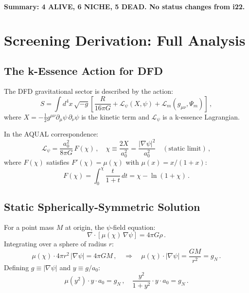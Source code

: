 \documentclass[11pt]{article}
\newcommand{\aM}{a_0}
\begin{document}
\textbf{Summary: 4 ALIVE, 6 NICHE, 5 DEAD.  No status changes from i22.}

\section{Screening Derivation: Full Analysis}
\label{sec:screening}

\subsection{The k-Essence Action for DFD}

The DFD gravitational sector is described by the action:
\begin{equation}
S = \int d^4x\,\sqrt{-g}\left[\frac{R}{16\pi G}
+ \mathcal{L}_\psi(X, \psi) + \mathcal{L}_m(g_{\mu\nu}, \Psi_m)\right]\,,
\end{equation}
where $X = -\frac{1}{2}g^{\mu\nu}\partial_\mu\psi\,\partial_\nu\psi$
is the kinetic term and $\mathcal{L}_\psi$ is a k-essence Lagrangian.

In the AQUAL correspondence:
\begin{equation}
\mathcal{L}_\psi = \frac{\aM^2}{8\pi G}\,F(\chi)\,,
\quad
\chi \equiv \frac{2X}{\aM^2} = \frac{|\nabla\psi|^2}{\aM^2}
\quad (\text{static limit})\,,
\end{equation}
where $F(\chi)$ satisfies $F'(\chi) = \mu(\chi)$ with
$\mu(x) = x/(1+x)$:
\begin{equation}
F(\chi) = \int_0^\chi \frac{t}{1+t}\,dt = \chi - \ln(1+\chi)\,.
\end{equation}

\subsection{Static Spherically-Symmetric Solution}

For a point mass $M$ at origin, the $\psi$-field equation:
\begin{equation}
\nabla\cdot[\mu(\chi)\,\nabla\psi] = 4\pi G\rho\,.
\end{equation}
Integrating over a sphere of radius $r$:
\begin{equation}
\mu(\chi)\cdot 4\pi r^2\,|\nabla\psi| = 4\pi GM\,,
\quad\Rightarrow\quad
\mu(\chi)\cdot|\nabla\psi| = \frac{GM}{r^2} = g_N\,.
\end{equation}
Defining $g \equiv |\nabla\psi|$ and $y \equiv g/\aM$:
\begin{equation}
\mu(y^2)\cdot y\cdot\aM = g_N\,,
\quad
\frac{y^2}{1+y^2}\cdot y\cdot\aM = g_N\,.
\end{equation}
\end{document}
